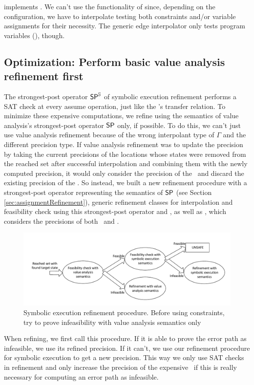  implements .
We can't use the functionality of  since, depending on the configuration, we have to interpolate
testing both constraints and/or variable assignments for their necessity.
The generic edge interpolator only tests program variables (), though.

\subsection{Optimization: Perform basic value analysis refinement first}
The strongest-post operator $\operatorname{\operatorname{\operatorname{\mathsf{SP}}}^{\mathbb{S}}}$ of symbolic execution refinement performs a SAT check at every assume operation, just like the \symbolicExecutionCPA's transfer relation.
To minimize these expensive computations, we refine using the semantics of value analysis's strongest-post operator $\operatorname{\operatorname{\operatorname{\mathsf{SP}}}}$ only, if possible.
To do this, we can't just use value analysis refinement because of the wrong interpolant type of $\Gamma$ and the different precision type.
If value analysis refinement was to update the precision by taking the current precisions of the locations whose states were removed from the reached set after successful interpolation and combining them with the newly computed precision, it would only consider the precision of the \ and discard the existing precision of the \constraintsCPA.
So instead, we built a new refinement procedure with a strongest-post operator representing the semantics of $\operatorname{\operatorname{\operatorname{\mathsf{SP}}}}$ (see Section \ref{sec:assignmentRefinement}),  generic refinement classes for interpolation and feasibility check using this strongest-post operator and , as well as , which considers the precisions of both \ and \constraintsCPA.

\begin{figure}[t!]
\includegraphics[width=\linewidth]{implementationCegar/DelegatingRefinementFlow}
\caption{Symbolic execution refinement procedure. Before using constraints, try to prove infeasibility with value analysis semantics only}
\label{fig:delegatingRefFlow}
\end{figure}
When refining, we first call this procedure. If it is able to prove the error path as infeasible, we use its refined precision.
If it can't, we use our refinement procedure for symbolic execution to get a new precision.
This way we only use SAT checks in refinement and only increase the precision of the expensive \constraintsCPA\ if this is really necessary for computing an error path as infeasible.

